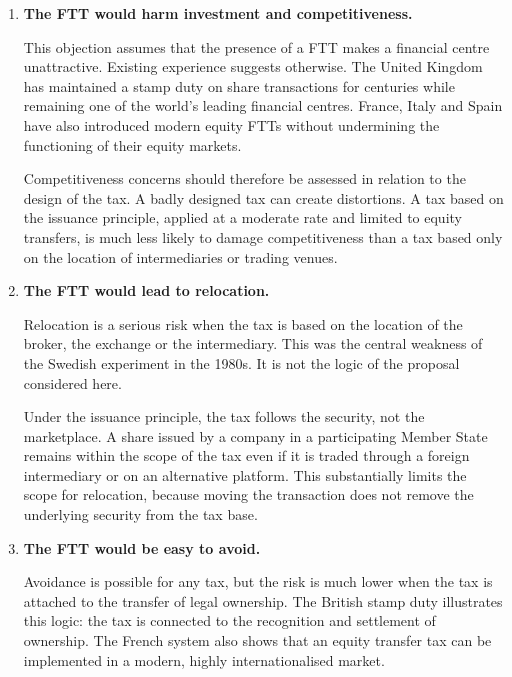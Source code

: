 \documentclass[../../main]{subfiles}
\begin{document}
\begin{enumerate}
    For long-term investors, the cost of a small FTT is spread over the holding period and is therefore limited. In addition, if the tax reduces trading frequency, the increase in the unit cost of trading may be partly offset by a fall in the number of transactions. This is why the effect on firms' cost of capital is likely to be tiny (at best) for a moderate tax applied to liquid equity markets.

    \item \textbf{The FTT would harm investment and competitiveness.}

    This objection assumes that the presence of a FTT makes a financial centre unattractive. Existing experience suggests otherwise. The United Kingdom has maintained a stamp duty on share transactions for centuries while remaining one of the world's leading financial centres. France, Italy and Spain have also introduced modern equity FTTs without undermining the functioning of their equity markets.

    Competitiveness concerns should therefore be assessed in relation to the design of the tax. A badly designed tax can create distortions. A tax based on the issuance principle, applied at a moderate rate and limited to equity transfers, is much less likely to damage competitiveness than a tax based only on the location of intermediaries or trading venues.

    \item \textbf{The FTT would lead to relocation.}

    Relocation is a serious risk when the tax is based on the location of the broker, the exchange or the intermediary. This was the central weakness of the Swedish experiment in the 1980s. It is not the logic of the proposal considered here.

    Under the issuance principle, the tax follows the security, not the marketplace. A share issued by a company in a participating Member State remains within the scope of the tax even if it is traded through a foreign intermediary or on an alternative platform. This substantially limits the scope for relocation, because moving the transaction does not remove the underlying security from the tax base.

    \item \textbf{The FTT would be easy to avoid.}

    Avoidance is possible for any tax, but the risk is much lower when the tax is attached to the transfer of legal ownership. The British stamp duty illustrates this logic: the tax is connected to the recognition and settlement of ownership. The French system also shows that an equity transfer tax can be implemented in a modern, highly internationalised market.


\end{enumerate}
\end{document}
